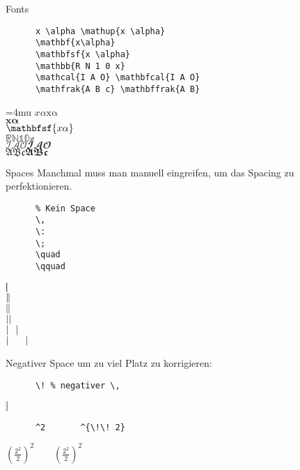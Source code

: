 \begin{frame}[fragile]{
  Fonts
  \hfill{}
}
  \begin{CodeExample}{0.70}
    \begin{lstlisting}
      x \alpha \mathup{x \alpha}
      \mathbf{x\alpha}
      \mathbfsf{x \alpha}
      \mathbb{R N 1 0 x}
      \mathcal{I A O} \mathbfcal{I A O}
      \mathfrak{A B c} \mathbffrak{A B}
    \end{lstlisting}
  \CodeResult
    \Umathordordspacing\textstyle=4mu
    $x \alpha \mathup{x \alpha}$ \\
    $\mathbf{x\alpha}$ \\
    $\mathbfsf{x \alpha}$ \\
    $\mathbb{R N 1 0 x}$ \\
    $\mathcal{I A O} \mathbfcal{I A O}$ \\
    $\mathfrak{A B c} \mathbffrak{A B c}$
  \end{CodeExample}
\end{frame}

\begin{frame}[fragile]{Spaces}
  Manchmal muss man manuell eingreifen, um das Spacing zu perfektionieren.
  \vspace{-1em}
  \begin{CodeExample}{0.48}
    \begin{lstlisting}
      % Kein Space
      \,
      \:
      \;
      \quad
      \qquad
    \end{lstlisting}
  \CodeResult
    $|\mspace{-5mu} |$ \\
    $|\mspace{-5mu} \,|$ \\
    $|\mspace{-5mu} \:|$ \\
    $|\mspace{-5mu} \;|$ \\
    $|\mspace{-5mu} \quad|$ \\
    $|\mspace{-5mu} \qquad|$ \\
  \end{CodeExample}
  Negativer Space um zu viel Platz zu korrigieren:
  \vspace{-1em}
  \begin{CodeExample}{0.48}
    \begin{lstlisting}
      \! % negativer \,
    \end{lstlisting}
  \CodeResult
    $|\mspace{-5mu} \!|$
  \end{CodeExample}
  \begin{CodeExample}{0.48}
    \begin{lstlisting}
      ^2       ^{\!\! 2}
    \end{lstlisting}
  \CodeResult
    $\displaystyle \left( \frac{2^2}{2} \right)^2
    \qquad \left( \frac{2^2}{2} \right)^{\!\! 2}$
  \end{CodeExample}
\end{frame}

